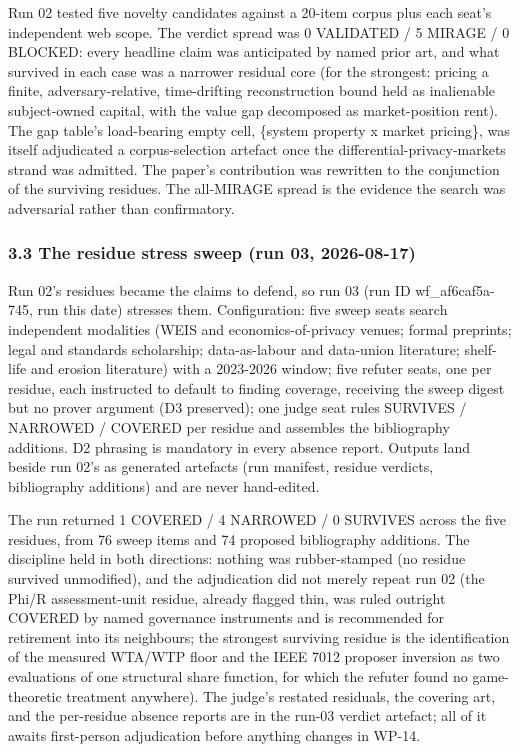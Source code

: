 \documentclass[
  11pt,
]{article}
\begin{document}
Run 02 tested five novelty candidates against a 20-item corpus plus each
seat's independent web scope. The verdict spread was 0 VALIDATED / 5
MIRAGE / 0 BLOCKED: every headline claim was anticipated by named prior
art, and what survived in each case was a narrower residual core (for
the strongest: pricing a finite, adversary-relative, time-drifting
reconstruction bound held as inalienable subject-owned capital, with the
value gap decomposed as market-position rent). The gap table's
load-bearing empty cell, \{system property x market pricing\}, was
itself adjudicated a corpus-selection artefact once the
differential-privacy-markets strand was admitted. The paper's
contribution was rewritten to the conjunction of the surviving residues.
The all-MIRAGE spread is the evidence the search was adversarial rather
than confirmatory.

\subsubsection{3.3 The residue stress sweep (run 03,
2026-08-17)}\label{the-residue-stress-sweep-run-03-2026-08-17}

Run 02's residues became the claims to defend, so run 03 (run ID
wf\_af6caf5a-745, run this date) stresses them. Configuration: five
sweep seats search independent modalities (WEIS and economics-of-privacy
venues; formal preprints; legal and standards scholarship;
data-as-labour and data-union literature; shelf-life and erosion
literature) with a 2023-2026 window; five refuter seats, one per
residue, each instructed to default to finding coverage, receiving the
sweep digest but no prover argument (D3 preserved); one judge seat rules
SURVIVES / NARROWED / COVERED per residue and assembles the bibliography
additions. D2 phrasing is mandatory in every absence report. Outputs
land beside run 02's as generated artefacts (run manifest, residue
verdicts, bibliography additions) and are never hand-edited.

The run returned 1 COVERED / 4 NARROWED / 0 SURVIVES across the five
residues, from 76 sweep items and 74 proposed bibliography additions.
The discipline held in both directions: nothing was rubber-stamped (no
residue survived unmodified), and the adjudication did not merely repeat
run 02 (the Phi/R assessment-unit residue, already flagged thin, was
ruled outright COVERED by named governance instruments and is
recommended for retirement into its neighbours; the strongest surviving
residue is the identification of the measured WTA/WTP floor and the IEEE
7012 proposer inversion as two evaluations of one structural share
function, for which the refuter found no game-theoretic treatment
anywhere). The judge's restated residuals, the covering art, and the
per-residue absence reports are in the run-03 verdict artefact; all of
it awaits first-person adjudication before anything changes in WP-14.
\end{document}
